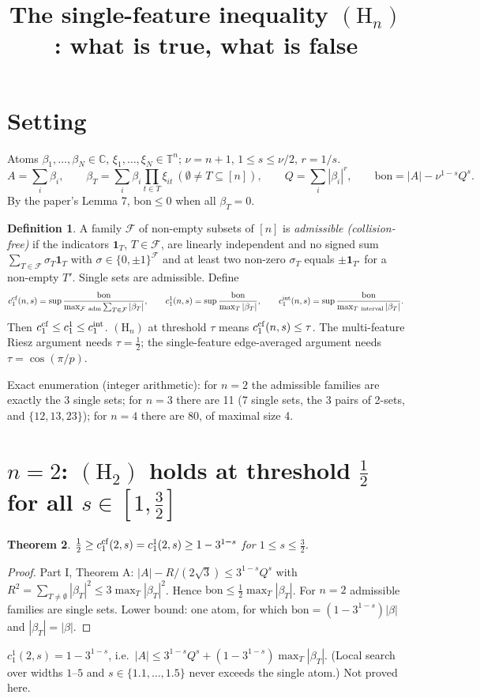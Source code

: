 \documentclass[11pt]{article}
\title{The single-feature inequality $(\mathrm H_n)$: what is true, what is false}
\date{}
\newtheorem{theorem}{Theorem}\newtheorem{proposition}[theorem]{Proposition}
\theoremstyle{definition}\newtheorem{definition}[theorem]{Definition}\newtheorem{remark}[theorem]{Remark}
\begin{document}
\maketitle

\section{Setting}
Atoms $\beta_1,\dots,\beta_N\in\mathbb C$, $\xi_1,\dots,\xi_N\in\mathbb T^n$; $\nu=n+1$, $1\le s\le\nu/2$, $r=1/s$.
\[A=\sum_i\beta_i,\qquad \beta_T=\sum_i\beta_i\prod_{t\in T}\xi_{it}\ (\emptyset\ne T\subseteq[n]),\qquad Q=\sum_i|\beta_i|^r,\qquad
\mathrm{bon}=|A|-\nu^{1-s}Q^s .\]
By the paper's Lemma 7, $\mathrm{bon}\le0$ when all $\beta_T=0$.

\begin{definition}
A family $\mathcal F$ of non-empty subsets of $[n]$ is \emph{admissible (collision-free)} if the indicators $\mathbf 1_T$, $T\in\mathcal F$,
are linearly independent and no signed sum $\sum_{T\in\mathcal F}\sigma_T\mathbf 1_T$ with $\sigma\in\{0,\pm1\}^{\mathcal F}$ and at least two
non-zero $\sigma_T$ equals $\pm\mathbf 1_{T'}$ for a non-empty $T'$.  Single sets are admissible.  Define
\[c_1^{\rm cf}(n,s)=\sup\frac{\mathrm{bon}}{\max_{\mathcal F\ \rm adm}\sum_{T\in\mathcal F}|\beta_T|},\qquad
c_1^{1}(n,s)=\sup\frac{\mathrm{bon}}{\max_T|\beta_T|},\qquad c_1^{\rm int}(n,s)=\sup\frac{\mathrm{bon}}{\max_{T\ \rm interval}|\beta_T|}.\]
Then $c_1^{\rm cf}\le c_1^{1}\le c_1^{\rm int}$.  $(\mathrm H_n)$ at threshold $\tau$ means $c_1^{\rm cf}(n,s)\le\tau$.
The multi-feature Riesz argument needs $\tau=\frac12$; the single-feature edge-averaged argument needs $\tau=\cos(\pi/p)$.
\end{definition}
Exact enumeration (integer arithmetic): for $n=2$ the admissible families are exactly the 3 single sets; for $n=3$ there are
11 (7 single sets, the 3 pairs of 2-sets, and $\{12,13,23\}$); for $n=4$ there are 80, of maximal size 4.

\section{$n=2$: $(\mathrm H_2)$ holds at threshold $\frac12$ for all $s\in[1,\frac32]$}
\begin{theorem}
$\frac12\ge c_1^{\rm cf}(2,s)=c_1^1(2,s)\ge1-3^{1-s}$ for $1\le s\le\frac32$.
\end{theorem}
\begin{proof}
Part I, Theorem A: $|A|-R/(2\sqrt3)\le3^{1-s}Q^s$ with $R^2=\sum_{T\ne\emptyset}|\beta_T|^2\le3\max_T|\beta_T|^2$.  Hence
$\mathrm{bon}\le\frac12\max_T|\beta_T|$.  For $n=2$ admissible families are single sets.  Lower bound: one atom, for which $\mathrm{bon}=(1-3^{1-s})|\beta|$
and $|\beta_T|=|\beta|$.
\end{proof}
\begin{conjecture}
$c_1^1(2,s)=1-3^{1-s}$, i.e.\ $|A|\le3^{1-s}Q^s+(1-3^{1-s})\max_T|\beta_T|$.  (Local search over widths $1$--$5$ and
$s\in\{1.1,\dots,1.5\}$ never exceeds the single atom.)  Not proved here.
\end{conjecture}
\end{document}

